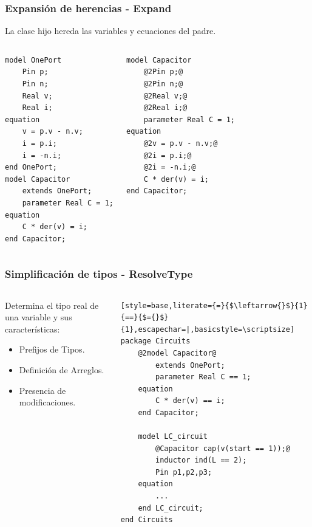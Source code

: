 \begin{frame}[fragile]
\frametitle{Expansión de herencias - Expand} 

\begin{block} {}
La clase hijo hereda las variables y ecuaciones del padre.
\end{block}

\pause 
\begin{columns} 
\begin{lstlisting}[style=base,basicstyle=\scriptsize]
model OnePort
    Pin p;
    Pin n;
    Real v;
    Real i;
equation
    v = p.v - n.v;
    i = p.i;
    i = -n.i;
end OnePort;
model Capacitor
    extends OnePort;
    parameter Real C = 1;
equation
    C * der(v) = i;
end Capacitor;
\end{lstlisting} 

\begin{lstlisting}[style=base,basicstyle=\scriptsize]
model Capacitor 
    @2Pin p;@
    @2Pin n;@
    @2Real v;@
    @2Real i;@
    parameter Real C = 1;
equation
    @2v = p.v - n.v;@
    @2i = p.i;@
    @2i = -n.i;@
    C * der(v) = i;
end Capacitor;
\end{lstlisting}
\end{columns}
\end{frame}


\begin{frame}[fragile]
\frametitle{Simplificación de tipos - ResolveType} 
\begin{columns} 
\begin{block}{}
Determina el tipo real de una variable y sus características: 
\begin{itemize}
    \item Prefijos de Tipos.
    \item Definición de Arreglos. 
    \item Presencia de modificaciones.
\end{itemize}
\end{block}
\pause
\begin{lstlisting}[style=base,literate={=}{$\leftarrow{}$}{1}{==}{$={}$}{1},escapechar=|,basicstyle=\scriptsize]
package Circuits
    @2model Capacitor@
        extends OnePort;
        parameter Real C == 1;
    equation
        C * der(v) == i;
    end Capacitor;
    
    model LC_circuit 
        @Capacitor cap(v(start == 1));@
        inductor ind(L == 2);
        Pin p1,p2,p3;
    equation
        ...
    end LC_circuit;
end Circuits    
\end{lstlisting}
\end{columns}
\end{frame}


